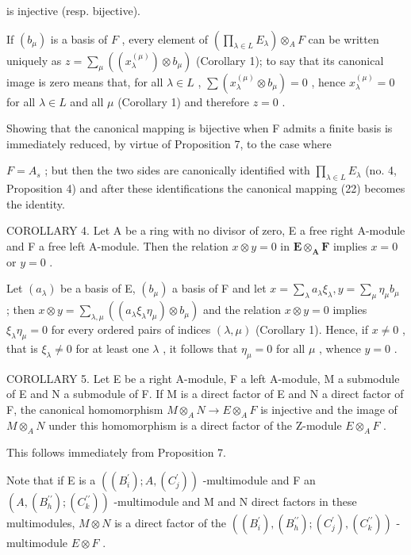 is injective (resp. bijective).

If \((b_{\mu})\) is a basis of \(F\) , every element of \(\left(\prod_{\lambda \in L} E_{\lambda}\right) \otimes_{A} F\) can be written uniquely as \(z = \sum_{\mu} ((x_{\lambda}^{(\mu)}) \otimes b_{\mu})\) (Corollary 1); to say that its canonical image is zero means that, for all \(\lambda \in L\) , \(\sum (x_{\lambda}^{(\mu)} \otimes b_{\mu}) = 0\) , hence \(x_{\lambda}^{(\mu)} = 0\) for all \(\lambda \in L\) and all \(\mu\) (Corollary 1) and therefore \(z = 0\) .

Showing that the canonical mapping is bijective when F admits a finite basis is immediately reduced, by virtue of Proposition 7, to the case where

\(F = A_{s}\) ; but then the two sides are canonically identified with \(\prod_{\lambda \in L} E_{\lambda}\) (no. 4, Proposition 4) and after these identifications the canonical mapping (22) becomes the identity.

COROLLARY 4. Let A be a ring with no divisor of zero, E a free right A-module and F a free left A-module. Then the relation \(x \otimes y = 0\) in \(\mathbf{E} \otimes_{\mathbf{A}} \mathbf{F}\) implies \(x = 0\) or \(y = 0\) .

Let \((a_{\lambda})\) be a basis of E, \((b_{\mu})\) a basis of F and let \(x = \sum_{\lambda} a_{\lambda} \xi_{\lambda}, y = \sum_{\mu} \eta_{\mu} b_{\mu}\) ; then \(x \otimes y = \sum_{\lambda, \mu} ((a_{\lambda} \xi_{\lambda} \eta_{\mu}) \otimes b_{\mu})\) and the relation \(x \otimes y = 0\) implies \(\xi_{\lambda} \eta_{\mu} = 0\) for every ordered pairs of indices \((\lambda, \mu)\) (Corollary 1). Hence, if \(x \neq 0\) , that is \(\xi_{\lambda} \neq 0\) for at least one \(\lambda\) , it follows that \(\eta_{\mu} = 0\) for all \(\mu\) , whence \(y = 0\) .

COROLLARY 5. Let E be a right A-module, F a left A-module, M a submodule of E and N a submodule of F. If M is a direct factor of E and N a direct factor of F, the canonical homomorphism \(M \otimes_{A} N \to E \otimes_{A} F\) is injective and the image of \(M \otimes_{A} N\) under this homomorphism is a direct factor of the Z-module \(E \otimes_{A} F\) .

This follows immediately from Proposition 7.

Note that if E is a \(((B_{i}^{\prime}); A, (C_{j}^{\prime}))\) -multimodule and F an \((A, (B_{h}^{\prime\prime}); (C_{k}^{\prime\prime}))\) -multimodule and M and N direct factors in these multimodules, \(M \otimes N\) is a direct factor of the \(((B_{i}^{\prime}), (B_{h}^{\prime\prime}); (C_{j}^{\prime}), (C_{k}^{\prime\prime}))\) -multimodule \(E \otimes F\) .

